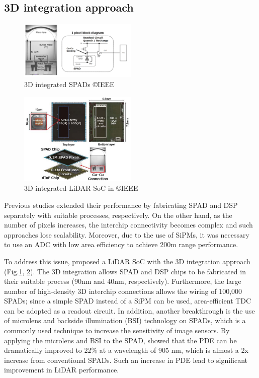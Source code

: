 \documentclass[paper]{ieice}
\begin{document}
\subsection{3D integration approach}
\begin{figure}[!t]
\centering
 \includegraphics[width=0.5\textwidth]{figs/sonypix.png}
  \caption{3D integrated SPADs \cite{ito2020back} \copyright IEEE}
\label{sony3d}
\end{figure}

\begin{figure}[!t]
\centering
 \includegraphics[width=0.5\textwidth]{figs/sony}
  \caption{3D integrated LiDAR SoC in \cite{kumagai2021189x600} \copyright IEEE}
\label{sony}
\end{figure}

\qquad Previous studies extended their performance by fabricating SPAD and DSP separately with suitable processes, respectively. On the other hand, as the number of pixels increases, the interchip connectivity becomes complex and such approaches lose scalability. Moreover, due to the use of SiPMs, it was necessary to use an ADC with low area efficiency to achieve 200m range performance\cite{yoshioka201820, kondo2020automotive}. 

To address this issue, \cite{kumagai2021189x600, ito2020back} proposed a LiDAR SoC with the 3D integration approach (Fig.\ref{sony3d}, \ref{sony}). 
The 3D integration allows SPAD and DSP chips to be fabricated in their suitable process (90nm and 40nm, respectively). Furthermore, the large number of high-density 3D interchip connections allows the wiring of 100,000 SPADs; since a simple SPAD instead of a SiPM can be used, area-efficient TDC can be adopted as a readout circuit.
In addition, another breakthrough is the use of microlens and backside illumination (BSI) technology on SPADs, which is a commonly used technique to increase the sensitivity of image sensors. By applying the microlens and BSI to the SPAD, \cite{kumagai2021189x600, ito2020back} showed that the PDE can be dramatically improved to 22\% at a wavelength of 905 nm, which is almost a 2x increase from conventional SPADs. Such an increase in PDE lead to significant improvement in LiDAR performance.
\end{document}
